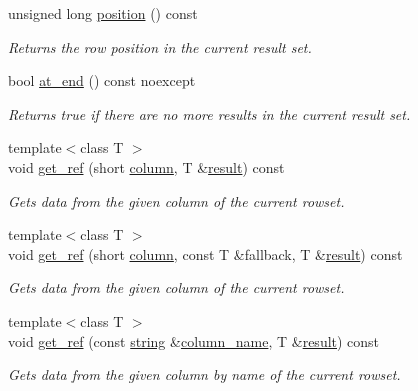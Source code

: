 \begin{DoxyCompactItemize}
unsigned long \mbox{\hyperlink{classnanodbc_1_1result_a240f2c35df4ff9816150918a60a83f0e}{position}} () const
\begin{DoxyCompactList}\small\item\em Returns the row position in the current result set. \end{DoxyCompactList}\item 
bool \mbox{\hyperlink{classnanodbc_1_1result_ab6c9e33d74b195c57766dcdd37d101d2}{at\+\_\+end}} () const noexcept
\begin{DoxyCompactList}\small\item\em Returns true if there are no more results in the current result set. \end{DoxyCompactList}\item 
{\footnotesize template$<$class T $>$ }\\void \mbox{\hyperlink{classnanodbc_1_1result_ad606b9ccfa02d6dbdae7a28c7a92bb14}{get\+\_\+ref}} (short \mbox{\hyperlink{classnanodbc_1_1result_ae4e254b2db63c65473cc058de3d5a844}{column}}, T \&\mbox{\hyperlink{classnanodbc_1_1result}{result}}) const
\begin{DoxyCompactList}\small\item\em Gets data from the given column of the current rowset. \end{DoxyCompactList}\item 
{\footnotesize template$<$class T $>$ }\\void \mbox{\hyperlink{classnanodbc_1_1result_a5f1ed8303dd506ed57a3eb87acd219b1}{get\+\_\+ref}} (short \mbox{\hyperlink{classnanodbc_1_1result_ae4e254b2db63c65473cc058de3d5a844}{column}}, const T \&fallback, T \&\mbox{\hyperlink{classnanodbc_1_1result}{result}}) const
\begin{DoxyCompactList}\small\item\em Gets data from the given column of the current rowset. \end{DoxyCompactList}\item 
{\footnotesize template$<$class T $>$ }\\void \mbox{\hyperlink{classnanodbc_1_1result_a09a12956778629533cbb619a4fd9216d}{get\+\_\+ref}} (const \mbox{\hyperlink{namespacenanodbc_abfc0ece56278e590911ec8352774c212}{string}} \&\mbox{\hyperlink{classnanodbc_1_1result_a2bd3fc4e416108960c4191b2cbba256b}{column\+\_\+name}}, T \&\mbox{\hyperlink{classnanodbc_1_1result}{result}}) const
\begin{DoxyCompactList}\small\item\em Gets data from the given column by name of the current rowset. \end{DoxyCompactList}\item 

\end{DoxyCompactItemize}
